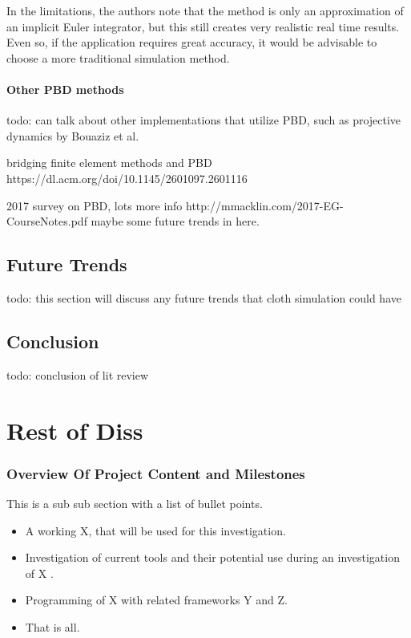 \documentclass[12pt,a4paper]{article}
\begin{document}
In the limitations, the authors note that the method is only an approximation of an implicit Euler integrator, but this still creates very realistic real time results. Even so, if the application requires great accuracy, it would be advisable to choose a more traditional simulation method.

\label{otherMethods}
\paragraph{Other PBD methods}
todo: can talk about other implementations that utilize PBD, such as projective dynamics by Bouaziz et al.
 
bridging finite element methods and PBD
https://dl.acm.org/doi/10.1145/2601097.2601116

2017 survey on PBD, lots more info
http://mmacklin.com/2017-EG-CourseNotes.pdf
maybe some future trends in here.


\subsection{Future Trends}
todo: this section will discuss any future trends that cloth simulation could have
\subsection{Conclusion}
todo: conclusion of lit review
\newpage



\section{Rest of Diss}

\subsubsection{Overview Of Project Content and Milestones}

This is a sub sub section with a list of bullet points.
\begin{itemize}\itemsep0pt
	\item A working X, that will be used for this investigation.
	\item Investigation of current tools and their potential use during an investigation of X .
	\item Programming of X with related frameworks Y and Z.
	\item That is all.
\end{itemize}
\end{document}
